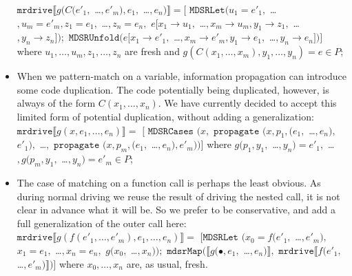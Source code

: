 \documentclass[submission,copyright,creativecommons]{eptcs}
\begin{document}
\begin{itemize}
    $\mathtt{mrdrive} \llbracket g(C(e'_1,$ \ldots$, e'_m), e_1,$ \ldots$, e_n) \rrbracket = [$
    $\mathtt{MDSRLet}(u_1=e'_1,$ \ldots$, u_m=e'_m, z_1=e_1,$ \ldots$, z_n=e_n,$ 
      $e [ x_1\rightarrow u_1,$ \ldots$, x_m\rightarrow u_m, y_1 \rightarrow z_1,$ \ldots$, y_n \rightarrow z_n ]);$ 
    $\mathtt{MDSRUnfold}(e [ x_1\rightarrow e'_1,$ \ldots$, x_m\rightarrow e'_m, y_1 \rightarrow e_1,$ \ldots$, y_n \rightarrow e_n ])]$
    where $u_1, \ldots, u_m, z_1, \ldots, z_n$ are fresh and $g(C(x_1, \ldots, x_m), y_1, \ldots, y_n) = e \in P$;
  \item When we pattern-match on a variable, information propagation can introduce some code duplication. 
    The code potentially being duplicated, however, is always of the form $C(x_1, \ldots, x_n)$.
    We have currently decided to accept this limited form of potential duplication, without adding a generalization: \\
    $\mathtt{mrdrive} \llbracket g(x, e_1, \ldots, e_n) \rrbracket =$
    $[$ $\mathtt{MDSRCases}$ $(x,$ $\mathtt{propagate}$ $(x, p_1, (e_1,$ \ldots$, e_n),$ $e'_1),$ \ldots$,$ 
    $\mathtt{propagate}$ $(x, p_m, (e_1,$ \ldots$, e_n), e'_m))]$
    where $g(p_1, y_1,$ \ldots$, y_n) = e'_1,$ \ldots$, g(p_m, y_1,$ \ldots$, y_n) = e'_m \in P$;
  \item The case of matching on a function call is perhaps the least obvious. 
    As during normal driving we reuse the result of driving the nested call, it is not clear in advance what
    it will be.
    So we prefer to be conservative, and add a full generalization of the outer call here: \\
    $\mathtt{mrdrive} \llbracket g(f(e'_1, \ldots, e'_m), e_1, \ldots, e_n) \rrbracket =$
    $[\mathtt{MDSRLet}$ $(x_0=f(e'_1,$ \ldots$, e'_m),$ $x_1=e_1,$ \ldots$, x_n=e_n,$ 
    $g(x_0,$ \ldots$, x_n));$ 
    $\mathtt{mdsrMap}(\llbracket g(\bullet, e_1,$ \ldots$, e_n) \rrbracket,$ $\mathtt{mrdrive} \llbracket f(e'_1,$ \ldots$, e'_m) \rrbracket)]$
    where $x_0, \ldots, x_n$ are, as usual, fresh.
\end{itemize}
\end{document}
